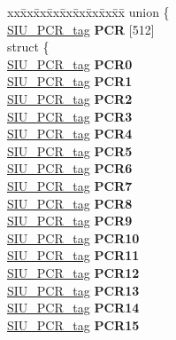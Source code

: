\begin{DoxyCompactItemize}
\mbox{\label{structSIU__tag_aa1093c2f56c1a3ba05dea1bac0c02874}} 
\begin{tabbing}
xx\=xx\=xx\=xx\=xx\=xx\=xx\=xx\=xx\=\kill
union \{\\
\>\mbox{\hyperlink{unionSIU__tag_1_1SIU__PCR__tag}{SIU\_PCR\_tag}} {\bfseries PCR} \mbox{[}512\mbox{]}\\
\mbox{\label{unionSIU__tag_1_1_0D1538_a5487c8f7b72371e132fd652f8ae3dcb8}} 
\>struct \{\\
\>\>\mbox{\hyperlink{unionSIU__tag_1_1SIU__PCR__tag}{SIU\_PCR\_tag}} {\bfseries PCR0}\\
\>\>\mbox{\hyperlink{unionSIU__tag_1_1SIU__PCR__tag}{SIU\_PCR\_tag}} {\bfseries PCR1}\\
\>\>\mbox{\hyperlink{unionSIU__tag_1_1SIU__PCR__tag}{SIU\_PCR\_tag}} {\bfseries PCR2}\\
\>\>\mbox{\hyperlink{unionSIU__tag_1_1SIU__PCR__tag}{SIU\_PCR\_tag}} {\bfseries PCR3}\\
\>\>\mbox{\hyperlink{unionSIU__tag_1_1SIU__PCR__tag}{SIU\_PCR\_tag}} {\bfseries PCR4}\\
\>\>\mbox{\hyperlink{unionSIU__tag_1_1SIU__PCR__tag}{SIU\_PCR\_tag}} {\bfseries PCR5}\\
\>\>\mbox{\hyperlink{unionSIU__tag_1_1SIU__PCR__tag}{SIU\_PCR\_tag}} {\bfseries PCR6}\\
\>\>\mbox{\hyperlink{unionSIU__tag_1_1SIU__PCR__tag}{SIU\_PCR\_tag}} {\bfseries PCR7}\\
\>\>\mbox{\hyperlink{unionSIU__tag_1_1SIU__PCR__tag}{SIU\_PCR\_tag}} {\bfseries PCR8}\\
\>\>\mbox{\hyperlink{unionSIU__tag_1_1SIU__PCR__tag}{SIU\_PCR\_tag}} {\bfseries PCR9}\\
\>\>\mbox{\hyperlink{unionSIU__tag_1_1SIU__PCR__tag}{SIU\_PCR\_tag}} {\bfseries PCR10}\\
\>\>\mbox{\hyperlink{unionSIU__tag_1_1SIU__PCR__tag}{SIU\_PCR\_tag}} {\bfseries PCR11}\\
\>\>\mbox{\hyperlink{unionSIU__tag_1_1SIU__PCR__tag}{SIU\_PCR\_tag}} {\bfseries PCR12}\\
\>\>\mbox{\hyperlink{unionSIU__tag_1_1SIU__PCR__tag}{SIU\_PCR\_tag}} {\bfseries PCR13}\\
\>\>\mbox{\hyperlink{unionSIU__tag_1_1SIU__PCR__tag}{SIU\_PCR\_tag}} {\bfseries PCR14}\\
\>\>\mbox{\hyperlink{unionSIU__tag_1_1SIU__PCR__tag}{SIU\_PCR\_tag}} {\bfseries PCR15}\\

\end{tabbing}
\end{DoxyCompactItemize}
